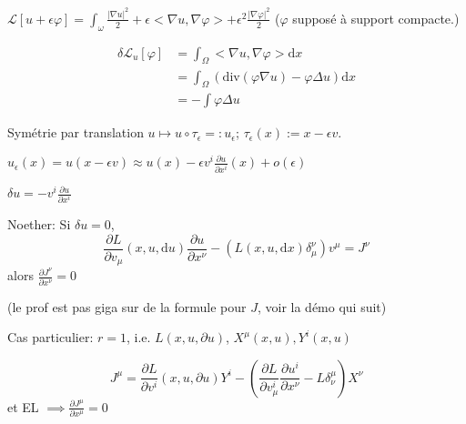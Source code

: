 \documentclass[a4paper,11pt]{article}
\renewcommand{\d}{{\mathrm{d}}}
\newcommand{\dr}[2]{\frac{\partial {#1}}{\partial{#2}}}
\begin{document}
$\mathcal{L}[u+\epsilon\varphi] = \int_\omega \frac{|\nabla u|^2}2 + \epsilon <\nabla u, \nabla \varphi> + \epsilon^2 \frac{|\nabla \varphi|^2}2$
 ($\varphi$ supposé à support compacte.)
 
\begin{align*}
\delta \mathcal{L}_u[\varphi] &= \int_\Omega <\nabla u, \nabla \varphi> \d x\\
&= \int_\Omega (\mathrm{div}(\varphi\nabla u) - \varphi \Delta u) \d x\\
&=- \int \varphi \Delta u
\end{align*}

Symétrie par translation $u \mapsto u\circ \tau_\epsilon =: u_\epsilon$; $\tau_\epsilon (x) := x-\epsilon v$.

$u_\epsilon(x) = u(x-\epsilon v) \approx u(x) - \epsilon v^i \dr u {x^i}(x) + o(\epsilon)$

$\delta u = - v^i \dr u {x^i}$

Noether: Si $\delta u = 0$, 
$$\dr L {v_\mu} (x,u,\d u) \dr u {x^\nu} - (L(x,u, \d x) \delta_\mu^\nu) v^\mu = J^\nu$$
alors $\dr{J^\nu}{x^\nu} = 0$

(le prof est pas giga sur de la formule pour $J$, voir la démo qui suit)

Cas particulier:
$r=1$, i.e. $L(x,u,\partial u)$, $X^\mu (x,u), Y^i(x,u)$

$$J^\mu = \dr L {v^i} (x,u,\partial u) Y^i - (\dr L {v^i_\mu} \dr{u^i}{x^\nu} - L \delta_\nu^\mu) X^\nu$$
et EL $\implies \dr{J^\mu}{x^\mu}=0$
\end{document}
